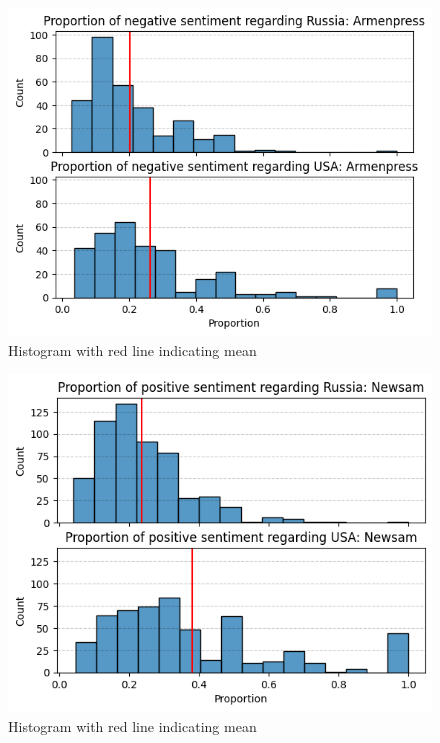 \documentclass{IEEEtran}
\begin{document}
\begin{figure}
    \centering
    \includegraphics[width=1\linewidth]{figures/sig3.png}
    \caption{Histogram with red line indicating mean}
    \label{fig:negative_russia_armenpress}
\end{figure}


\begin{figure}
    \centering
    \includegraphics[width=1\linewidth]{figures/sig4.png}
    \caption{Histogram with red line indicating mean}
    \label{fig:positive_russia_newsam}
\end{figure}
\end{document}
